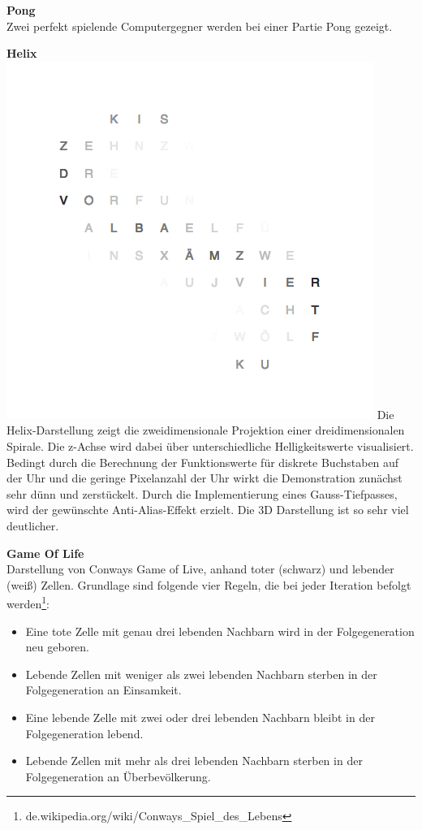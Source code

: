 \begin{multicols}{2}
\textbf{Pong} \\
Zwei perfekt spielende Computergegner werden bei einer Partie Pong gezeigt.

\textbf{Helix} \\
\includegraphics[width=\columnwidth]{Abbildungen/Software/Demo/Helix}
Die Helix-Darstellung zeigt die zweidimensionale Projektion einer dreidimensionalen Spirale. Die z-Achse wird dabei über unterschiedliche Helligkeitswerte visualisiert.
Bedingt durch die Berechnung der Funktionswerte für diskrete Buchstaben auf der Uhr und die geringe Pixelanzahl der Uhr wirkt die Demonstration zunächst sehr dünn und zerstückelt. Durch die Implementierung eines Gauss-Tiefpasses, wird der gewünschte Anti-Alias-Effekt erzielt. Die 3D Darstellung ist so sehr viel deutlicher. 

\textbf{Game Of Life} \\
Darstellung von Conways Game of Live, anhand toter (schwarz) und lebender (weiß) Zellen. 
Grundlage sind folgende vier Regeln, die bei jeder Iteration befolgt werden\footnote{de.wikipedia.org/wiki/Conways\_Spiel\_des\_Lebens}:
\begin{itemize}
\item Eine tote Zelle mit genau drei lebenden Nachbarn wird in der Folgegeneration neu geboren.
\item Lebende Zellen mit weniger als zwei lebenden Nachbarn sterben in der Folgegeneration an Einsamkeit.
\item Eine lebende Zelle mit zwei oder drei lebenden Nachbarn bleibt in der Folgegeneration lebend.
\item Lebende Zellen mit mehr als drei lebenden Nachbarn sterben in der Folgegeneration an Überbevölkerung.
\end{itemize}


\end{multicols}
